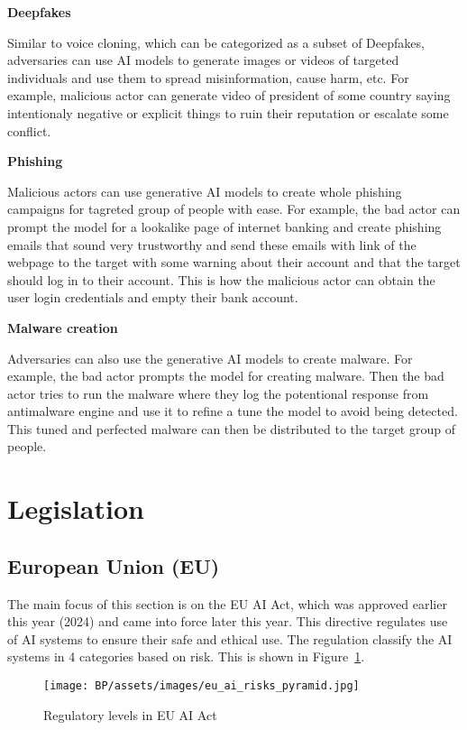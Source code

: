 \textbf{Deepfakes}

Similar to voice cloning, which can be categorized as a subset of Deepfakes, adversaries can use AI models to generate images or videos of targeted individuals and use them to spread misinformation, cause harm, etc. For example, malicious actor can generate video of president of some country saying intentionaly negative or explicit things to ruin their reputation or escalate some conflict.

\textbf{Phishing}

Malicious actors can use generative AI models to create whole phishing campaigns for tagreted group of people with ease. For example, the bad actor can prompt the model for a lookalike page of internet banking and create phishing emails that sound very trustworthy and send these emails with link of the webpage to the target with some warning about their account and that the target should log in to their account. This is how the malicious actor can obtain the user login credentials and empty their bank account.

\textbf{Malware creation}

Adversaries can also use the generative AI models to create malware. For example, the bad actor prompts the model for creating malware. Then the bad actor tries to run the malware where they log the potentional response from antimalware engine and use it to refine a tune the model to avoid being detected. This tuned and perfected malware can then be distributed to the target group of people.


\section{Legislation} \label{sec:legislation}

\subsection{European Union (EU)}
The main focus of this section is on the EU AI Act\cite{eu_ai_act_2024}, which was approved earlier this year (2024) and came into force later this year. This directive regulates use of AI systems to ensure their safe and ethical use. The regulation classify the AI systems in 4 categories based on risk. This is shown in Figure~\ref{fig:ai-act-pyramid}.

\begin{figure}[h]
\begin{centering}
\texttt{[image: BP/assets/images/eu\_ai\_risks\_pyramid.jpg]}
\par\end{centering}
\caption{Regulatory levels in EU AI Act \cite{eu_ai_regulation_picture}
 \label{fig:ai-act-pyramid}}
\end{figure}

